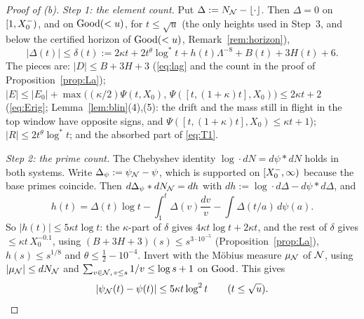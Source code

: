 \begin{proof}[Proof of (b)]
\emph{Step 1: the element count.} Put $\Delta:=N_{\mathcal{N}}-\lfloor\cdot\rfloor$. Then $\Delta=0$ on $[1,X_0^{-})$, and on $\mathrm{Good}(<u)$, for
$t\le\sqrt u$ (the only heights used in Step~3, and below the certified horizon of $\mathrm{Good}(<u)$, Remark~\ref{rem:horizon}),
\[
  |\Delta(t)|\le\delta(t):=2\kappa t+2t^{\theta}\log^*t+h(t)\Lambda^{-8}+B(t)+3H(t)+6.
\]
The pieces are: $|D|\le B+3H+3$ (\eqref{eq:lag} and the count in the proof of Proposition~\ref{prop:La});
$|E|\le|E_0|+\max\bigl((\kappa/2)\Psi(t,X_0),\,\Psi([t,(1+\kappa)t],X_0)\bigr)\le2\kappa t+2$ (\eqref{eq:Erig}; Lemma~\ref{lem:blin}(4),(5): the drift and
the mass still in flight in the top window have opposite signs, and $\Psi([t,(1+\kappa)t],X_0)\le\kappa t+1$); $|R|\le2t^{\theta}\log^*t$;
and the absorbed part of \eqref{eq:T1}.

\emph{Step 2: the prime count.} The Chebyshev identity $\log\cdot dN=d\psi*dN$ holds in both systems. Write $\Delta_\psi:=\psi_{\mathcal{N}}-\psi$,
which is supported on $[X_0^{-},\infty)$ because the base primes coincide. Then $d\Delta_\psi*dN_{\mathcal{N}}=dh$ with
$dh:=\log\cdot d\Delta-d\psi*d\Delta$, and
\[
  h(t)=\Delta(t)\log t-\int_1^t\Delta(v)\frac{dv}v-\int\Delta(t/a)\,d\psi(a).
\]
So $|h(t)|\le5\kappa t\log t$: the $\kappa$-part of $\delta$ gives $4\kappa t\log t+2\kappa t$, and the rest of $\delta$ gives
$\le\kappa t\,X_0^{-0.1}$, using $(B+3H+3)(s)\le s^{3\cdot10^{-5}}$ (Proposition~\ref{prop:La}), $h(s)\le s^{1/8}$ and $\theta\le\tfrac12-10^{-4}$.
Invert with the M\"obius measure $\mu_{\mathcal{N}}$ of $\mathcal{N}$, using $|\mu_{\mathcal{N}}|\le dN_{\mathcal{N}}$ and $\sum_{v\in\mathcal{N},\,v\le s}1/v\le\log s+1$ on $\mathrm{Good}$.
This gives
\[
  |\psi_{\mathcal{N}}(t)-\psi(t)|\le5\kappa t\log^2t\qquad(t\le\sqrt u).
\]


\end{proof}
